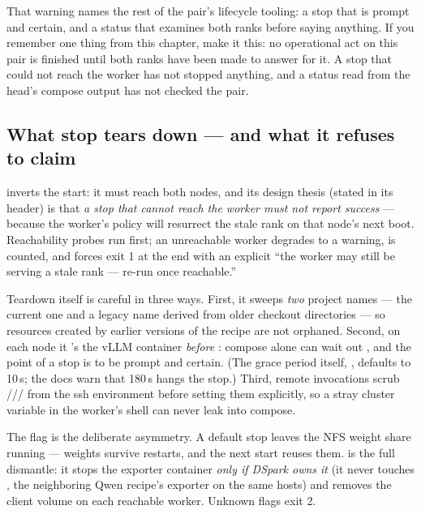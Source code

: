 That warning names the rest of the pair's lifecycle tooling: a stop that is
prompt and certain, and a status that examines both ranks before saying
anything. If you remember one thing from this chapter, make it this: no
operational act on this pair is finished until both ranks have been made to
answer for it. A stop that could not reach the worker has not stopped
anything, and a status read from the head's compose output has not checked
the pair.

\subsection{What stop tears down --- and what it refuses to claim}

 inverts the start: it must reach
both nodes, and its design thesis (stated in its header) is that \emph{a stop
that cannot reach the worker must not report success} --- because the worker's
 policy will resurrect the stale rank on that
node's next boot. Reachability probes run first; an unreachable worker degrades
to a warning, is counted, and forces exit 1 at the end with an explicit
``the worker may still be serving a stale rank --- re-run once reachable.''

Teardown itself is careful in three ways. First, it sweeps \emph{two} project
names --- the current one and a legacy name derived from older checkout
directories --- so resources created by earlier versions of the recipe are not
orphaned. Second, on each node it 's the vLLM container
\emph{before} : compose alone can wait out
, and the point of a stop is to be prompt and
certain. (The grace period itself, , defaults to
10\,s; the docs warn that 180\,s hangs the stop.) Third, remote invocations scrub
/// from the
ssh environment before setting them explicitly, so a stray cluster variable in
the worker's shell can never leak into compose.

The  flag is the deliberate asymmetry. A default stop leaves the
NFS weight share running --- weights survive restarts, and the next start
reuses them.  is the full dismantle: it stops the
 exporter container \emph{only if DSpark owns it} (it never
touches , the neighboring Qwen recipe's exporter on the same
hosts) and removes the  client volume on each reachable
worker. Unknown flags exit 2.

